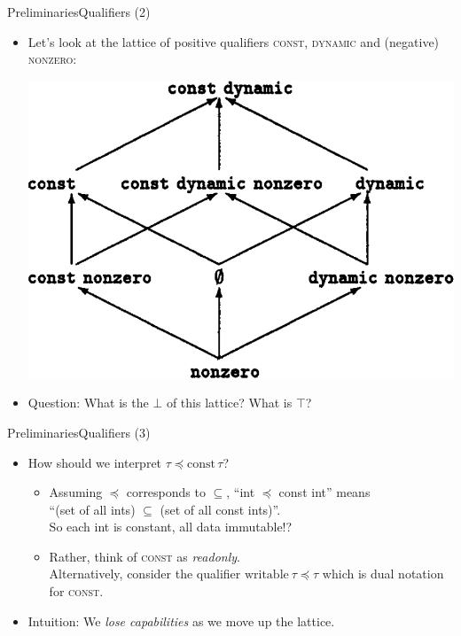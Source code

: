 \documentclass{beamer}
\begin{document}
\begin{frame}{Preliminaries}{Qualifiers (2)}
  \begin{itemize}
  \item Let's look at the lattice of positive qualifiers \textsc{const}, \textsc{dynamic} and (negative) \textsc{nonzero}: 
    \begin{center}\includegraphics[scale=0.25]{paper_qualifierlattice_sample.png}\end{center}
  \item<2-> Question: What is the $\bot$ of this lattice? What is $\top$?\\
  \end{itemize}
\end{frame}

\begin{frame}{Preliminaries}{Qualifiers (3)}
  \begin{itemize}
  \item How should we interpret $\tau \preceq \text{const}\,\tau$?
    \begin{itemize}
    \item<2-> Assuming $\preceq$ corresponds to $\subseteq$, ``int $\preceq$ const int'' means\\ ``(set of all ints) $\subseteq$ (set of all const ints)''.\\
    So each int is constant, all data immutable!?
    \item<3-> Rather, think of \textsc{const} as \emph{readonly}.\\ Alternatively, consider the qualifier $\text{writable}\ \tau \preceq \tau$ which is dual notation for \textsc{const}.
    \end{itemize}
  \item<4->[$\Rightarrow$] Intuition: We \emph{lose capabilities} as we move up the lattice.
  \end{itemize}
\end{frame}
\end{document}
